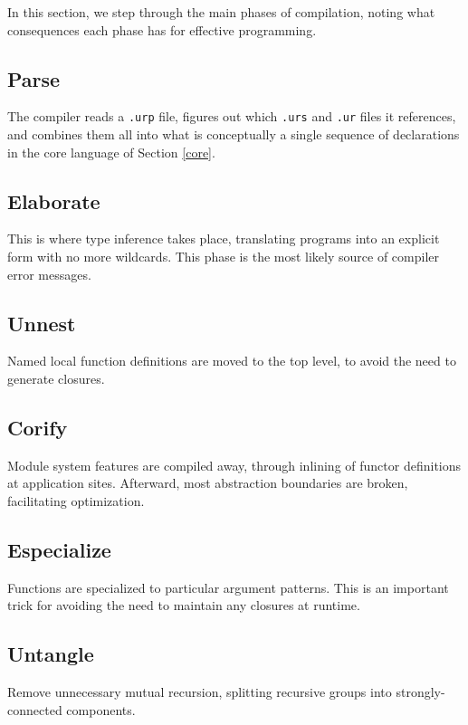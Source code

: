 \documentclass{article}
\begin{document}
In this section, we step through the main phases of compilation, noting what consequences each phase has for effective programming.

\subsection{Parse}

The compiler reads a \texttt{.urp} file, figures out which \texttt{.urs} and \texttt{.ur} files it references, and combines them all into what is conceptually a single sequence of declarations in the core language of Section \ref{core}.

\subsection{Elaborate}

This is where type inference takes place, translating programs into an explicit form with no more wildcards.  This phase is the most likely source of compiler error messages.

\subsection{Unnest}

Named local function definitions are moved to the top level, to avoid the need to generate closures.

\subsection{Corify}

Module system features are compiled away, through inlining of functor definitions at application sites.  Afterward, most abstraction boundaries are broken, facilitating optimization.

\subsection{Especialize}

Functions are specialized to particular argument patterns.  This is an important trick for avoiding the need to maintain any closures at runtime.

\subsection{Untangle}

Remove unnecessary mutual recursion, splitting recursive groups into strongly-connected components.
\end{document}
